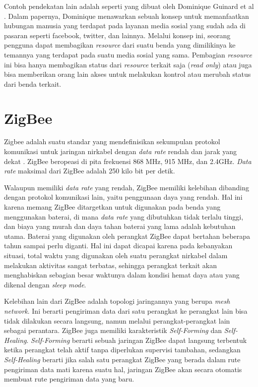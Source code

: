 Contoh pendekatan lain adalah seperti yang dibuat oleh Dominique Guinard et al \cite{guinard2010sharing}. Dalam papernya, Dominique menawarkan sebuah konsep untuk memanfaatkan hubungan manusia yang terdapat pada layanan media sosial yang sudah ada di pasaran seperti facebook, twitter, dan lainnya. Melalui konsep ini, seorang pengguna dapat membagikan \textit{resource} dari suatu benda yang dimilikinya ke temannya yang terdapat pada suatu media sosial yang sama. Pembagian \textit{resource} ini bisa hanya membagikan status dari \textit{resource} terkait saja (\textit{read only}) atau juga bisa memberikan orang lain akses untuk melakukan kontrol atau merubah status dari benda terkait.

\section{ZigBee}
Zigbee adalah suatu standar yang mendefinisikan sekumpulan protokol komunikasi untuk jaringan nirkabel dengan \textit{data rate} rendah dan jarak yang dekat \cite{farahani2011zigbee}. ZigBee beropeasi di pita frekuensi 868 MHz, 915 MHz, dan 2.4GHz. \textit{Data rate} maksimal dari ZigBee adalah 250 kilo bit per detik.

Walaupun memiliki \textit{data rate} yang rendah, ZigBee memiliki kelebihan dibanding dengan protokol komunikasi lain, yaitu penggunaan daya yang rendah. Hal ini karena memang ZigBee ditargetkan untuk digunakan pada benda yang menggunakan baterai, di mana \textit{data rate} yang dibutuhkan tidak terlalu tinggi, dan biaya yang murah dan daya tahan baterai yang lama adalah kebutuhan utama. Baterai yang digunakan oleh perangkat ZigBee dapat bertahan beberapa tahun sampai perlu diganti. Hal ini dapat dicapai karena pada kebanyakan situasi, total waktu yang digunakan oleh suatu perangkat nirkabel dalam melakukan aktivitas sangat terbatas, sehingga perangkat terkait akan menghabiskan sebagian besar waktunya dalam kondisi hemat daya atau yang dikenal dengan \textit{sleep mode}\cite{farahani2011zigbee}.

Kelebihan lain dari ZigBee adalah topologi jaringannya yang berupa \textit{mesh network}. Ini berarti pengiriman data dari satu perangkat ke perangkat lain bisa tidak dilakukan secara langsung, namun melalui perangkat-perangkat lain sebagai perantara. ZigBee juga memiliki karakteristik \textit{Self-Forming} dan \textit{Self-Healing}. \textit{Self-Forming} berarti sebuah jaringan ZigBee dapat langsung terbentuk ketika perangkat telah aktif tanpa diperlukan supervisi tambahan, sedangkan \textit{Self-Healing} berarti jika salah satu perangkat ZigBee yang berada dalam rute pengiriman data mati karena suatu hal, jaringan ZigBee akan secara otomatis membuat rute pengiriman data yang baru.

